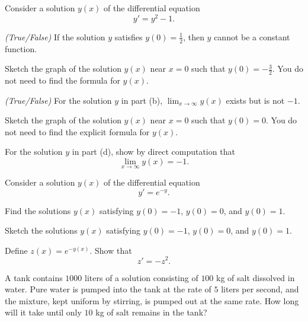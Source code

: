 \begin{problem}
Consider a solution $y(x)$ of the differential equation
\[
y'=y^2-1.
\]
\begin{problemsubparts}
\item \textit{(True/False)} If the solution $y$ satisfies $y(0)=\frac12$, then $y$ cannot be a constant function.
\item Sketch the graph of the solution $y(x)$ near $x=0$ such that $y(0)=-\frac32$. You do not need to find the formula for $y(x)$.
\item \textit{(True/False)} For the solution $y$ in part (b), $\lim_{x\to\infty}y(x)$ exists but is not $-1$.
\item Sketch the graph of the solution $y(x)$ near $x=0$ such that $y(0)=0$. You do not need to find the explicit formula for $y(x)$.
\item For the solution $y$ in part (d), show by direct computation that
\[
\lim_{x\to\infty}y(x)=-1.
\]
\end{problemsubparts}
\end{problem}

\begin{problem}
Consider a solution $y(x)$ of the differential equation
\[
y'=e^{-y}.
\]
\begin{problemsubparts}
\item Find the solutions $y(x)$ satisfying $y(0)=-1$, $y(0)=0$, and $y(0)=1$.
\item Sketch the solutions $y(x)$ satisfying $y(0)=-1$, $y(0)=0$, and $y(0)=1$.
\item Define $z(x)=e^{-y(x)}$. Show that
\[
z'=-z^2.
\]
\end{problemsubparts}
\end{problem}

\begin{problem}
A tank contains $1000$ liters of a solution consisting of $100$ kg of salt dissolved in water. Pure water is pumped into the tank at the rate of $5$ liters per second, and the mixture, kept uniform by stirring, is pumped out at the same rate. How long will it take until only $10$ kg of salt remains in the tank?
\end{problem}

